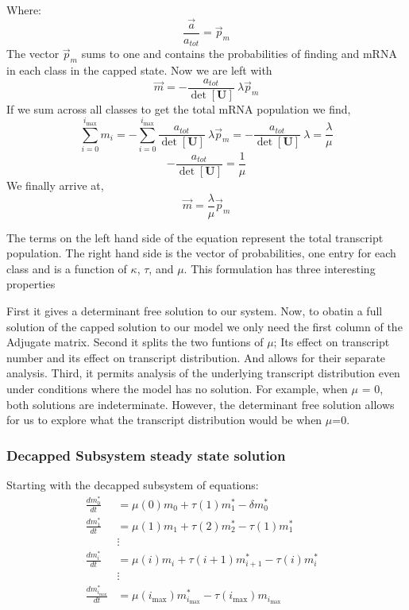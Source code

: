 \documentclass[review]{elsarticle}
\newcommand{\imax}{\ensuremath{i_{\max}}\xspace}
\let\bs\boldsymbol
\begin{document}
Where:
	\begin{equation*}
		\frac{\vec{a}}{a_{tot}} = \vec{p}_m
	\end{equation*}
The vector $\vec{p}_m$ sums to one and contains the probabilities of finding and mRNA in each class in the capped state. Now we are left with
	\begin{equation*}
		\vec{m}=-\frac{a_{tot}}{\det[\bs{U}]} \: \lambda\vec{p}_m
	\end{equation*}
If we sum across all classes to get the total mRNA population we find,
	\begin{equation*}
		\sum_{i=0}^{\imax}m_{i} =-\sum_{i=0}^{\imax} \frac{a_{tot}}{\det[\bs{U}]} \: \lambda\vec{p}_m =-\frac{a_{tot}}{\det[\bs{U}]} \: \lambda = \frac{\lambda}{\mu}
	\end{equation*}
	\begin{equation*}
		-\frac{a_{tot}}{\det[\bs{U}]} = \frac{1}{\mu}
	\end{equation*}
We finally arrive at,
	\begin{equation} \label{eq:capped_solution}
		\vec{m}=\frac{\lambda}{\mu}\vec{p}_m
	\end{equation}


The terms on the left hand side of the equation represent the total transcript population. The right hand side is the vector of probabilities, one entry for each class and is a function of $\kappa$, $\tau$, and $\mu$.
This formulation has three interesting properties

First it gives a determinant free solution to our system. Now, to obatin a full solution of the capped solution to our model we only need the first column of the Adjugate matrix.
Second it splits the two funtions of $\mu$; Its effect on transcript number and its effect on transcript distribution. And allows for their separate analysis.
Third, it permits analysis of the underlying transcript distribution even under conditions where the model has no solution. For example, when $\mu$ = 0, both solutions are indeterminate. However, the determinant free solution allows for us to explore what the transcript distribution would be when $\mu$=0.
	

\subsubsection{Decapped Subsystem steady state solution}

Starting with the decapped subsystem of equations:
\begin{align*}
\frac{dm_{0}^{*}}{dt} &= \mu(0)m_{0}+\tau(1)m_{1}^{*}-\delta m_{0}^{*} \\
\frac{dm_{1}^{*}}{dt} &= \mu(1)m_{1}+\tau(2)m_{2}^{*}-\tau(1)m_{1}^{*} \\
& \vdots & \\
\frac{dm_{i}^{*}}{dt} &= \mu(i)m_{i}+\tau(i+1)m_{i+1}^{*}-\tau(i)m_{i}^{*} \\
& \vdots & \\
\frac{dm_{\imax}^{*}}{dt} &= \mu(\imax)m_{\imax}^{*}-\tau(\imax)m_{\imax} \\
\end{align*}
\end{document}
